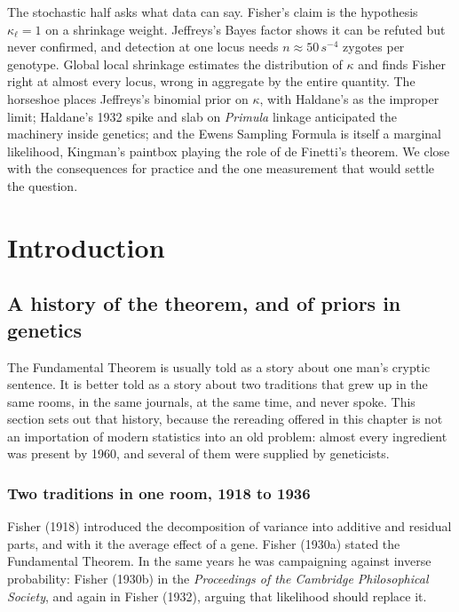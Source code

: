 \begin{chaptersummary}
The stochastic half asks what data can say. Fisher's claim is the hypothesis $\kappa_\ell=1$ on a
shrinkage weight. Jeffreys's Bayes factor shows it can be refuted but never confirmed, and detection
at one locus needs $n\approx50\,s^{-4}$ zygotes per genotype. Global local shrinkage estimates the
distribution of $\kappa$ and finds Fisher right at almost every locus, wrong in aggregate by the
entire quantity. The horseshoe places Jeffreys's binomial prior on $\kappa$, with Haldane's as the
improper limit; Haldane's 1932 spike and slab on \emph{Primula} linkage anticipated the machinery
inside genetics; and the Ewens Sampling Formula is itself a marginal likelihood, Kingman's paintbox
playing the role of de Finetti's theorem. We close with the consequences for practice and the one
measurement that would settle the question.
\end{chaptersummary}
\section{Introduction}
\label{ftns:sec:intro}

\subsection{A history of the theorem, and of priors in genetics}
\label{ftns:sec:history}

The Fundamental Theorem is usually told as a story about one man's cryptic sentence. It is better
told as a story about two traditions that grew up in the same rooms, in the same journals, at the
same time, and never spoke. This section sets out that history, because the rereading offered in
this chapter is not an importation of modern statistics into an old problem: almost every ingredient
was present by 1960, and several of them were supplied by geneticists.

\subsubsection{Two traditions in one room, 1918 to 1936}

Fisher (1918) introduced the decomposition of variance into additive and residual parts, and with
it the average effect of a gene. Fisher (1930a) stated the Fundamental Theorem. In the same years
he was campaigning against inverse probability: Fisher (1930b) in the \emph{Proceedings of the
Cambridge Philosophical Society}, and again in Fisher (1932), arguing that likelihood should
replace it.

